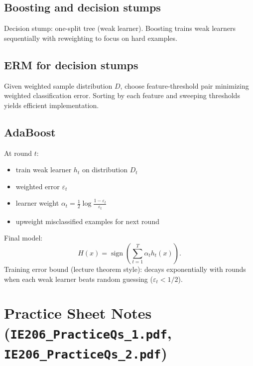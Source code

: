 \documentclass[11pt]{article}
\newcommand{\1}{\mathbf{1}}
\begin{document}
\subsection*{Boosting and decision stumps}
Decision stump: one-split tree (weak learner).
Boosting trains weak learners sequentially with reweighting to focus on hard examples.

\subsection*{ERM for decision stumps}
Given weighted sample distribution $D$, choose feature-threshold pair minimizing weighted classification error. Sorting by each feature and sweeping thresholds yields efficient implementation.

\subsection*{AdaBoost}
At round $t$:
\begin{itemize}
\item train weak learner $h_t$ on distribution $D_t$
\item weighted error $\varepsilon_t$
\item learner weight $\alpha_t=\frac12\log\frac{1-\varepsilon_t}{\varepsilon_t}$
\item upweight misclassified examples for next round
\end{itemize}
Final model:
\[
H(x)=\operatorname{sign}\left(\sum_{t=1}^T \alpha_t h_t(x)\right).
\]
Training error bound (lecture theorem style): decays exponentially with rounds when each weak learner beats random guessing ($\varepsilon_t<1/2$).

\section{Practice Sheet Notes (\texttt{IE206\_PracticeQs\_1.pdf}, \texttt{IE206\_PracticeQs\_2.pdf})}
\end{document}
